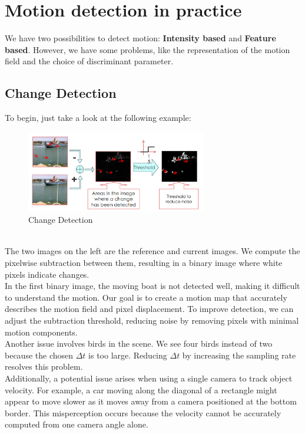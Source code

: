 \section{Motion detection in practice}
We have two possibilities to detect motion: \textbf{Intensity based} and \textbf{Feature based}. However, we have some problems, like the representation of the motion field and the choice of discriminant parameter.
\subsection{Change Detection}
To begin, just take a look at the following example:
\begin{figure}[h]
    \centering
    \includegraphics[width=0.7\textwidth]{Figures/ChangeDetection.png}
    \caption{Change Detection}
\end{figure}
\\The two images on the left are the reference and current images. 
We compute the pixelwise subtraction between them, resulting in a binary image where white pixels indicate changes.
\\
In the first binary image, the moving boat is not detected well, making it difficult to understand the motion. 
Our goal is to create a motion map that accurately describes the motion field and pixel displacement. 
To improve detection, we can adjust the subtraction threshold, reducing noise by removing pixels with minimal motion components.
\\
Another issue involves birds in the scene. We see four birds instead of two because the chosen $\Delta t$ is too large. 
Reducing $\Delta t$ by increasing the sampling rate resolves this problem.
\\
Additionally, a potential issue arises when using a single camera to track object velocity. 
For example, a car moving along the diagonal of a rectangle might appear to move slower as it moves away from a camera positioned at the bottom border. 
This misperception occurs because the velocity cannot be accurately computed from one camera angle alone.
\\
